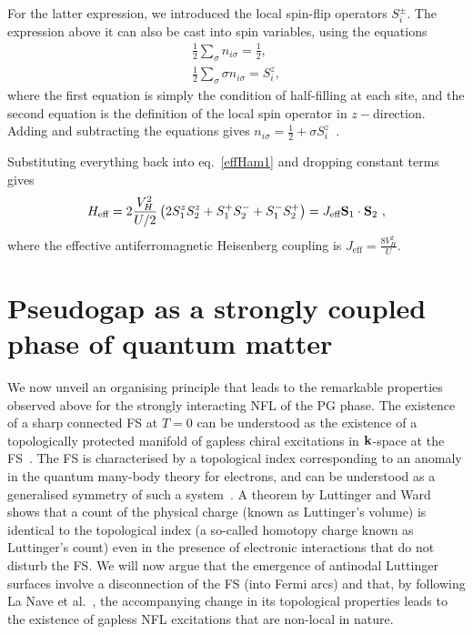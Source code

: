 For the latter expression, we introduced the local spin-flip operators \(S_i^\pm\). The expression above it can also be cast into spin variables, using the equations
\begin{equation}\begin{aligned}
	\frac{1}{2}\sum_{\sigma}n_{i\sigma} = \frac{1}{2},\\
    \frac{1}{2}\sum_{\sigma}\sigma n_{i\sigma} = S_i^z,
\end{aligned}\end{equation}
where the first equation is simply the condition of half-filling at each site, and the second equation is the definition of the local spin operator in \(z-\)direction. Adding and subtracting the equations gives \(n_{i\sigma} = \frac{1}{2} + \sigma S_i^z\)~.

Substituting everything back into eq.~\ref{effHam1} and dropping constant terms gives
\begin{equation}\begin{aligned}
	H_\text{eff} = 2\frac{V_H^2}{U/2}\left(2S_1^z S_2^z + S_1^+S_2^- + S_1^-S_2^+\right) = J_\text{eff} {\bf S}_1\cdot{\bf S}_2~,
\end{aligned}\end{equation}
where the effective antiferromagnetic Heisenberg coupling is \(J_\text{eff} = \frac{8V_H^2}{U}\).

\section{Pseudogap as a strongly coupled phase of quantum matter}\label{pseudogapasnovelphase}
We now unveil an organising principle that leads to the remarkable properties observed above for the strongly interacting NFL of the PG phase. The existence of a sharp connected FS at $T=0$ can be understood as the existence of a topologically protected manifold of gapless chiral excitations in ${\bf k}$-space at the FS~\cite{Heath_2020}. The FS is characterised by a topological index corresponding to an anomaly in the quantum many-body theory for electrons, and can be understood as a generalised symmetry of such a system~\cite{lanave2025,McGreevy2023}. A theorem by Luttinger and Ward~\cite{luttinger1960ground} shows that a count of the physical charge (known as Luttinger's volume) is identical to the topological index (a so-called homotopy charge known as Luttinger's count) even in the presence of electronic interactions that do not disturb the FS. We will now argue that the emergence of antinodal Luttinger surfaces involve a disconnection of the FS (into Fermi arcs) and that, by following La Nave et al.~\cite{lanave2025}, the accompanying change in its topological properties leads to the existence of gapless NFL excitations that are non-local in nature.

